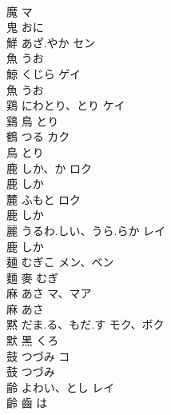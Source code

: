 \documentclass[8pt]{extreport}
\begin{document}
\begin{CJK}{UTF8}{min}
\\	魔		マ	
\\	鬼		おに		
\\	鮮	あざ.やか	セン	
\\	魚		うお		
\\	鯨	くじら	ゲイ	
\\	魚		うお		
\\	鶏	にわとり、とり	ケイ	
\\	鷄	鳥		とり		
\\	鶴	つる	カク	
\\	鳥		とり		
\\	鹿	しか、か	ロク	
\\	鹿		しか		
\\	麓	ふもと	ロク	
\\	鹿		しか		
\\	麗	うるわ.しい、うら.らか	レイ	
\\	鹿		しか		
\\	麺	むぎこ	メン、ベン	
\\	麵	麥		むぎ		
\\	麻	あさ	マ、マア	
\\	麻		あさ		
\\	黙	だま.る、もだ.す	モク、ボク	
\\	默	黑		くろ		
\\	鼓	つづみ	コ	
\\	鼓		つづみ		
\\	齢	よわい、とし	レイ	
\\	齡	齒		は		
\end{CJK}
\end{document}
